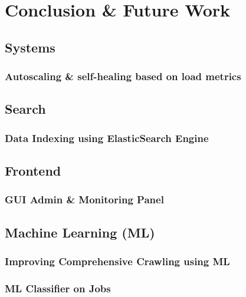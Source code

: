 \chapter{Conclusion \& Future Work}
\section{Systems}
\subsection{Autoscaling \& self-healing based on load metrics}

\section{Search}
\subsection{Data Indexing using ElasticSearch Engine}

\section{Frontend}
\subsection{GUI Admin \& Monitoring Panel}

\section{Machine Learning (ML)}
\subsection{Improving Comprehensive Crawling using ML}
\subsection{ML Classifier on Jobs}

\pagebreak